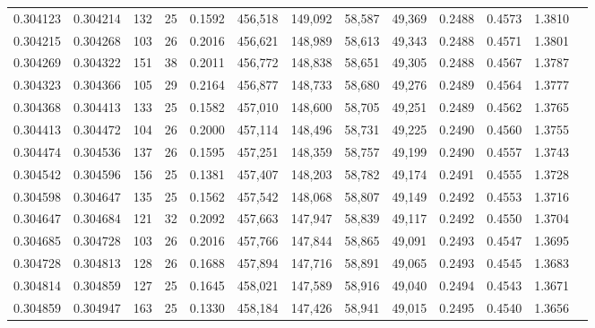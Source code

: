 \begin{tabular}{rrrrrrrrrrrrr}
0.304123 & 0.304214 &   132 &  25 &                                     0.1592 & 456,518 & 149,092 &  58,587 &  49,369 & 0.2488 & 0.4573 & 1.3810 \\
0.304215 & 0.304268 &   103 &  26 &                                     0.2016 & 456,621 & 148,989 &  58,613 &  49,343 & 0.2488 & 0.4571 & 1.3801 \\
0.304269 & 0.304322 &   151 &  38 &                                     0.2011 & 456,772 & 148,838 &  58,651 &  49,305 & 0.2488 & 0.4567 & 1.3787 \\
0.304323 & 0.304366 &   105 &  29 &                                     0.2164 & 456,877 & 148,733 &  58,680 &  49,276 & 0.2489 & 0.4564 & 1.3777 \\
0.304368 & 0.304413 &   133 &  25 &                                     0.1582 & 457,010 & 148,600 &  58,705 &  49,251 & 0.2489 & 0.4562 & 1.3765 \\
0.304413 & 0.304472 &   104 &  26 &                                     0.2000 & 457,114 & 148,496 &  58,731 &  49,225 & 0.2490 & 0.4560 & 1.3755 \\
0.304474 & 0.304536 &   137 &  26 &                                     0.1595 & 457,251 & 148,359 &  58,757 &  49,199 & 0.2490 & 0.4557 & 1.3743 \\
0.304542 & 0.304596 &   156 &  25 &                                     0.1381 & 457,407 & 148,203 &  58,782 &  49,174 & 0.2491 & 0.4555 & 1.3728 \\
0.304598 & 0.304647 &   135 &  25 &                                     0.1562 & 457,542 & 148,068 &  58,807 &  49,149 & 0.2492 & 0.4553 & 1.3716 \\
0.304647 & 0.304684 &   121 &  32 &                                     0.2092 & 457,663 & 147,947 &  58,839 &  49,117 & 0.2492 & 0.4550 & 1.3704 \\
0.304685 & 0.304728 &   103 &  26 &                                     0.2016 & 457,766 & 147,844 &  58,865 &  49,091 & 0.2493 & 0.4547 & 1.3695 \\
0.304728 & 0.304813 &   128 &  26 &                                     0.1688 & 457,894 & 147,716 &  58,891 &  49,065 & 0.2493 & 0.4545 & 1.3683 \\
0.304814 & 0.304859 &   127 &  25 &                                     0.1645 & 458,021 & 147,589 &  58,916 &  49,040 & 0.2494 & 0.4543 & 1.3671 \\
0.304859 & 0.304947 &   163 &  25 &                                     0.1330 & 458,184 & 147,426 &  58,941 &  49,015 & 0.2495 & 0.4540 & 1.3656 \\

\end{tabular}
